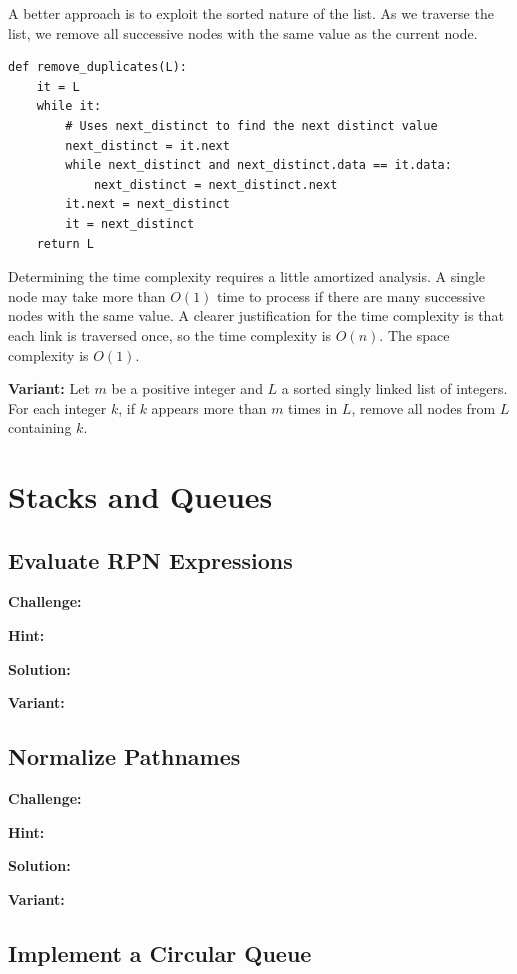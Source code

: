 \documentclass[11pt,a4paper]{article}
\begin{document}
A better approach is to exploit the sorted nature of the list. As we traverse
the list, we remove all successive nodes with the same value as the current
node.

\begin{verbatim}
def remove_duplicates(L):
    it = L
    while it:
        # Uses next_distinct to find the next distinct value 
        next_distinct = it.next
        while next_distinct and next_distinct.data == it.data:
            next_distinct = next_distinct.next 
        it.next = next_distinct
        it = next_distinct
    return L  
\end{verbatim}

Determining the time complexity requires a little amortized analysis. A single
node may take more than $O(1)$ time to process if there are many successive
nodes with the same value. A clearer justification for the time complexity is
that each link is traversed once, so the time complexity is $O(n)$. The space
complexity is $O(1)$.

\textbf{Variant:} Let $m$ be a positive integer and $L$ a sorted singly linked
list of integers. For each integer $k$, if $k$ appears more than $m$ times in
$L$, remove all nodes from $L$ containing $k$.

\section{Stacks and Queues}

\subsection{Evaluate RPN Expressions}

\textbf{Challenge:} 

\textbf{Hint:} 

\textbf{Solution:} 

\textbf{Variant:} 

\subsection{Normalize Pathnames}

\textbf{Challenge:} 

\textbf{Hint:} 

\textbf{Solution:} 

\textbf{Variant:} 

\subsection{Implement a Circular Queue}
\end{document}
